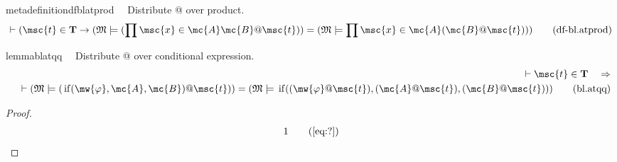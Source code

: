\begin{restatable}{metadefinition}{dfblatprod}~~ Distribute @ over product.
\begin{align}
\vdash ( \msc{t} \in \mathbf{T} \rightarrow ( \mathfrak{M} \models ( \prod
    \msc{x} \in \mc{A} \mc{B} @ \msc{t} ) ) = ( \mathfrak{M} \models \prod
    \msc{x} \in \mc{A} ( \mc{B} @ \msc{t} ) )
    )\label{eq:df-bl.atprod}\tag{df-bl.atprod}
\end{align}
\end{restatable}

\begin{restatable}{lemma}{blatqq}~~ Distribute @ over conditional expression.
\begin{align}
\vdash \msc{t} \in \mathbf{T}\quad\Rightarrow \notag \\ 
	\quad \vdash ( \mathfrak{M}
    \models ( \,\mathrm{if} ( \mw{\varphi} , \mc{A} , \mc{B} ) @ \msc{t} ) ) =
    ( \mathfrak{M} \models \,\mathrm{if} ( ( \mw{\varphi} @ \msc{t} ) , (
    \mc{A} @ \msc{t} ) , ( \mc{B} @ \msc{t} ) )
    )\label{eq:bl.atqq}\tag{bl.atqq}
\end{align}
\end{restatable}

\begin{proof}
\begin{align}
  1 &&  & &(\mbox{\ref{eq:?}})\notag
\end{align}
\end{proof}

